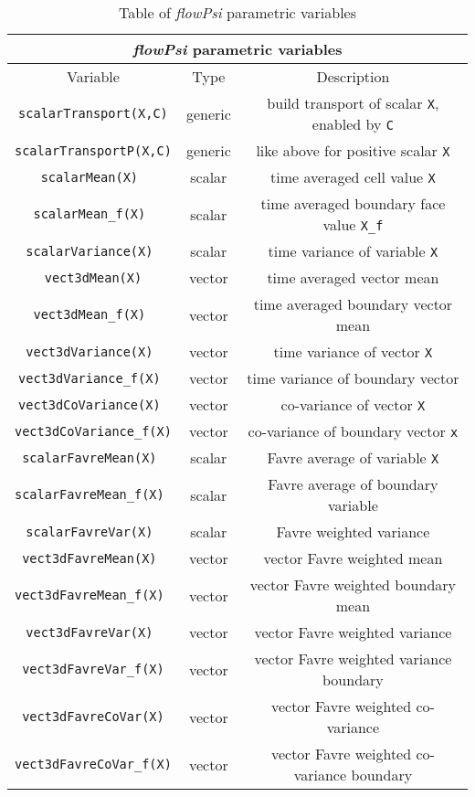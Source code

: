 \documentclass[letterpaper,twoside]{article}
\begin{document}
\begin{table}
\caption{Table of {\it flowPsi} parametric variables}
\label{tab:flowPsiParam}
\begin{center}
\begin{tabular}{|c|c|c|}
\hline
\multicolumn{3}{|c|}{ {\it flowPsi} parametric variables}\\
\hline
Variable & Type & Description\\
\hline\hline
{\tt scalarTransport(X,C)} & generic & build transport of scalar {\tt X},
enabled by {\tt C}\\
{\tt scalarTransportP(X,C)} & generic & like above for positive scalar
{\tt X}\\
{\tt  scalarMean(X) }& scalar & time averaged cell value {\tt X}\\
{\tt  scalarMean\_f(X) }& scalar & time averaged boundary face value {\tt X\_f}\\
{\tt  scalarVariance(X) }& scalar & time variance of variable {\tt X}\\
{\tt  vect3dMean(X)} & vector & time averaged vector mean\\
{\tt  vect3dMean\_f(X) }& vector & time averaged boundary vector mean\\
{\tt  vect3dVariance(X) }& vector & time variance of vector {\tt X}\\
{\tt  vect3dVariance\_f(X) }& vector & time variance of boundary vector\\
{\tt  vect3dCoVariance(X) }& vector & co-variance of vector {\tt X}\\
{\tt  vect3dCoVariance\_f(X)} & vector & co-variance of boundary vector
  {\tt x}\\  
{\tt  scalarFavreMean(X) }& scalar & Favre average of variable {\tt X}\\
{\tt  scalarFavreMean\_f(X) }& scalar & Favre average of boundary variable \\
{\tt  scalarFavreVar(X) }& scalar & Favre weighted variance\\
{\tt  vect3dFavreMean(X) }& vector & vector Favre weighted mean\\
{\tt  vect3dFavreMean\_f(X) }& vector & vector Favre weighted boundary mean\\
{\tt  vect3dFavreVar(X) }& vector & vector Favre weighted variance\\
{\tt  vect3dFavreVar\_f(X)} & vector & vector Favre weighted variance boundary\\
{\tt  vect3dFavreCoVar(X)} & vector & vector Favre weighted co-variance\\
{\tt  vect3dFavreCoVar\_f(X)} & vector & vector Favre weighted
  co-variance boundary\\
\hline
\end{tabular}
\end{center}
\end{table}
\end{document}

